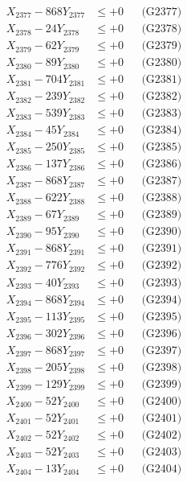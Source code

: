 \documentclass[a4paper,10pt]{article}
\begin{document}
{\begin{align}
X_{2377} - 868Y_{2377} &\leq +0 && \text{(G2377)} \\
X_{2378} - 24Y_{2378} &\leq +0 && \text{(G2378)} \\
X_{2379} - 62Y_{2379} &\leq +0 && \text{(G2379)} \\
X_{2380} - 89Y_{2380} &\leq +0 && \text{(G2380)} \\
\allowbreak
X_{2381} - 704Y_{2381} &\leq +0 && \text{(G2381)} \\
X_{2382} - 239Y_{2382} &\leq +0 && \text{(G2382)} \\
X_{2383} - 539Y_{2383} &\leq +0 && \text{(G2383)} \\
X_{2384} - 45Y_{2384} &\leq +0 && \text{(G2384)} \\
X_{2385} - 250Y_{2385} &\leq +0 && \text{(G2385)} \\
X_{2386} - 137Y_{2386} &\leq +0 && \text{(G2386)} \\
X_{2387} - 868Y_{2387} &\leq +0 && \text{(G2387)} \\
X_{2388} - 622Y_{2388} &\leq +0 && \text{(G2388)} \\
X_{2389} - 67Y_{2389} &\leq +0 && \text{(G2389)} \\
X_{2390} - 95Y_{2390} &\leq +0 && \text{(G2390)} \\
\allowbreak
X_{2391} - 868Y_{2391} &\leq +0 && \text{(G2391)} \\
X_{2392} - 776Y_{2392} &\leq +0 && \text{(G2392)} \\
X_{2393} - 40Y_{2393} &\leq +0 && \text{(G2393)} \\
X_{2394} - 868Y_{2394} &\leq +0 && \text{(G2394)} \\
X_{2395} - 113Y_{2395} &\leq +0 && \text{(G2395)} \\
X_{2396} - 302Y_{2396} &\leq +0 && \text{(G2396)} \\
X_{2397} - 868Y_{2397} &\leq +0 && \text{(G2397)} \\
X_{2398} - 205Y_{2398} &\leq +0 && \text{(G2398)} \\
X_{2399} - 129Y_{2399} &\leq +0 && \text{(G2399)} \\
X_{2400} - 52Y_{2400} &\leq +0 && \text{(G2400)} \\
\allowbreak
X_{2401} - 52Y_{2401} &\leq +0 && \text{(G2401)} \\
X_{2402} - 52Y_{2402} &\leq +0 && \text{(G2402)} \\
X_{2403} - 52Y_{2403} &\leq +0 && \text{(G2403)} \\
X_{2404} - 13Y_{2404} &\leq +0 && \text{(G2404)} \\

\end{align}}
\end{document}
